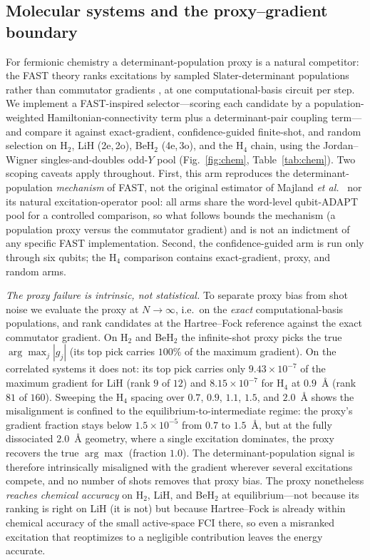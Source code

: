 \documentclass[aps,pra,reprint,superscriptaddress,nofootinbib,floatfix]{revtex4-2}
\begin{document}
\subsection{Molecular systems and the proxy--gradient boundary}
\label{sec:res-chem}

For fermionic chemistry a determinant-population proxy is a natural competitor: the FAST theory ranks excitations by sampled Slater-determinant populations rather than commutator gradients \cite{majland2023fast}, at one computational-basis circuit per step. We implement a FAST-inspired selector---scoring each candidate by a population-weighted Hamiltonian-connectivity term plus a determinant-pair coupling term---and compare it against exact-gradient, confidence-guided finite-shot, and random selection on H$_2$, LiH (2e,\,2o), BeH$_2$ (4e,\,3o), and the H$_4$ chain, using the Jordan--Wigner singles-and-doubles odd-$Y$ pool (Fig.~\ref{fig:chem}, Table~\ref{tab:chem}). Two scoping caveats apply throughout. First, this arm reproduces the determinant-population \emph{mechanism} of FAST, not the original estimator of Majland \emph{et al.}\ \cite{majland2023fast} nor its natural excitation-operator pool: all arms share the word-level qubit-ADAPT pool for a controlled comparison, so what follows bounds the mechanism (a population proxy versus the commutator gradient) and is not an indictment of any specific FAST implementation. Second, the confidence-guided arm is run only through six qubits; the H$_4$ comparison contains exact-gradient, proxy, and random arms.

\emph{The proxy failure is intrinsic, not statistical.} To separate proxy bias from shot noise we evaluate the proxy at $N\to\infty$, i.e.\ on the \emph{exact} computational-basis populations, and rank candidates at the Hartree--Fock reference against the exact commutator gradient. On H$_2$ and BeH$_2$ the infinite-shot proxy picks the true $\arg\max_j|g_j|$ (its top pick carries $100\%$ of the maximum gradient). On the correlated systems it does not: its top pick carries only $9.43\times10^{-7}$ of the maximum gradient for LiH (rank $9$ of $12$) and $8.15\times10^{-7}$ for H$_4$ at $0.9$~\AA{} (rank $81$ of $160$). Sweeping the H$_4$ spacing over $0.7$, $0.9$, $1.1$, $1.5$, and $2.0$~\AA{} shows the misalignment is confined to the equilibrium-to-intermediate regime: the proxy's gradient fraction stays below $1.5\times10^{-5}$ from $0.7$ to $1.5$~\AA{}, but at the fully dissociated $2.0$~\AA{} geometry, where a single excitation dominates, the proxy recovers the true $\arg\max$ (fraction $1.0$). The determinant-population signal is therefore intrinsically misaligned with the gradient wherever several excitations compete, and no number of shots removes that proxy bias. The proxy nonetheless \emph{reaches chemical accuracy} on H$_2$, LiH, and BeH$_2$ at equilibrium---not because its ranking is right on LiH (it is not) but because Hartree--Fock is already within chemical accuracy of the small active-space FCI there, so even a misranked excitation that reoptimizes to a negligible contribution leaves the energy accurate.
\end{document}
